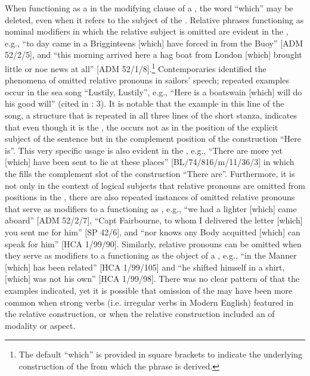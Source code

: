 When functioning as a  in the modifying clause of a , the word “which” may be deleted, even when it refers to the subject of the . Relative phrases functioning as nominal modifiers in which the relative subject  is omitted are evident in the , e.g., “to day came in a Brigginteens [which] have forced in from the Buoy” [ADM 52/2/5], and “this morning arrived here a hag boat from London [which] brought little or noe news at all” [ADM 52/1/8].\footnote{The default  “which” is provided in square brackets to indicate the underlying construction of the  from which the phrase is derived.} Contemporaries identified the phenomena of omitted relative pronouns in sailors’ speech; repeated examples occur in the sea song “Lustily, Lustily”, e.g., “Here is a boatswain [which] will do his good will” (cited in \citealt{Palmer1986}: 3). It is notable that the example in this line of the song, a structure that is repeated in all three lines of the short stanza, indicates that even though it is the , the  occurs not as in the position of the explicit subject of the sentence but in the complement position of the  construction “Here is”. This very specific usage is also evident in the , e.g., “There are more yet [which] have been sent to lie at these places” [BL/74/816/m/11/36/3] in which the  fills the complement slot of the  construction “There are”. Furthermore, it is not only in the context of logical subjects that relative pronouns are omitted from positions in the , there are also repeated instances of omitted relative pronouns that serve as modifiers to a  functioning as , e.g., “we had a lighter [which] came aboard” [ADM 52/2/7], “Capt Fairbourne, to whom I delivered the letter [which] you sent me for him” [SP 42/6], and “nor knows any Body acquitted [which] can speak for him” [HCA 1/99/90]. Similarly, relative pronouns can be omitted when they serve as modifiers to a  functioning as the object of a , e.g., “in the Manner [which] has been related” [HCA 1/99/105] and “he shifted himself in a shirt, [which] was not his own” [HCA 1/99/98]. There was no clear pattern of  that the  examples indicated, yet it is possible that omission of the  may have been more common when strong verbs (i.e. irregular verbs in Modern English) featured in the relative construction, or when the relative construction included an  of modality or aspect. 

